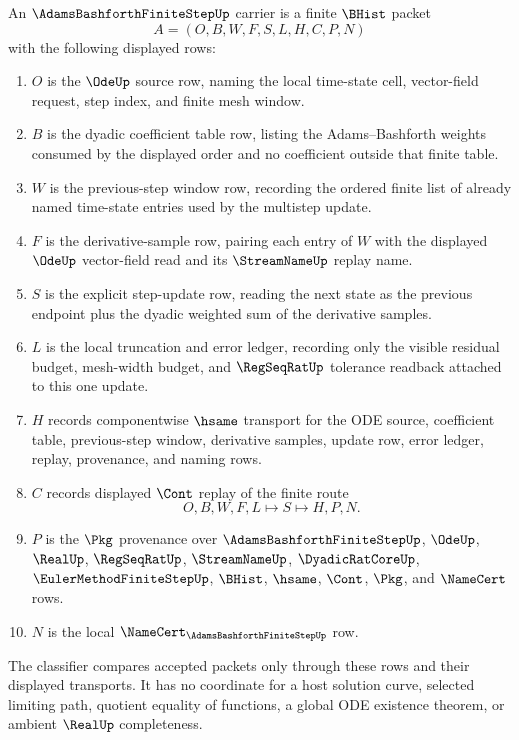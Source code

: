 \begin{definition}
\label{def:adams-bashforth-finite-step-carrier}
An $\AdamsBashforthFiniteStepUp$ carrier is a finite $\BHist$ packet
$$
A=(O,B,W,F,S,L,H,C,P,N)
$$
with the following displayed rows:
\begin{enumerate}
\item $O$ is the $\OdeUp$ source row, naming the local time-state cell, vector-field request, step index, and finite mesh window.
\item $B$ is the dyadic coefficient table row, listing the Adams--Bashforth weights consumed by the displayed order and no coefficient outside that finite table.
\item $W$ is the previous-step window row, recording the ordered finite list of already named time-state entries used by the multistep update.
\item $F$ is the derivative-sample row, pairing each entry of $W$ with the displayed $\OdeUp$ vector-field read and its $\StreamNameUp$ replay name.
\item $S$ is the explicit step-update row, reading the next state as the previous endpoint plus the dyadic weighted sum of the derivative samples.
\item $L$ is the local truncation and error ledger, recording only the visible residual budget, mesh-width budget, and $\RegSeqRatUp$ tolerance readback attached to this one update.
\item $H$ records componentwise $\hsame$ transport for the ODE source, coefficient table, previous-step window, derivative samples, update row, error ledger, replay, provenance, and naming rows.
\item $C$ records displayed $\Cont$ replay of the finite route
$$
O,B,W,F,L \longmapsto S \longmapsto H,P,N .
$$
\item $P$ is the $\Pkg$ provenance over $\AdamsBashforthFiniteStepUp$, $\OdeUp$, $\RealUp$, $\RegSeqRatUp$, $\StreamNameUp$, $\DyadicRatCoreUp$, $\EulerMethodFiniteStepUp$, $\BHist$, $\hsame$, $\Cont$, $\Pkg$, and $\NameCert$ rows.
\item $N$ is the local $\NameCert_{\AdamsBashforthFiniteStepUp}$ row.
\end{enumerate}
The classifier compares accepted packets only through these rows and their displayed transports. It has no coordinate for a host solution curve, selected limiting path, quotient equality of functions, a global ODE existence theorem, or ambient $\RealUp$ completeness.
\end{definition}

